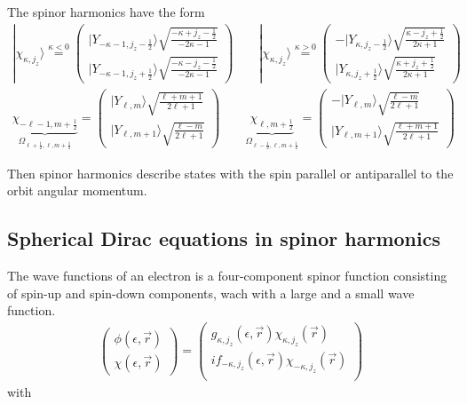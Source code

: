 \documentclass[11pt,a4paper]{report}
\begin{document}
The spinor harmonics have the form
\begin{eqnarray}
|\chi_{\kappa,j_z}\rangle
\stackrel{\kappa<0}{=}\left(
\begin{array}{c}
|Y_{-\kappa-1,j_z-\frac{1}{2}}\rangle
\sqrt{\frac{-\kappa+j_z-\frac{1}{2}}{-2\kappa-1}}\\
|Y_{-\kappa-1,j_z+\frac{1}{2}}\rangle
\sqrt{\frac{-\kappa-j_z-\frac{1}{2}}{-2\kappa-1}}\end{array}\right)
\qquad
|\chi_{\kappa,j_z}\rangle
\stackrel{\kappa>0}{=}\left(
\begin{array}{c}
-|Y_{\kappa,j_z-\frac{1}{2}}\rangle
\sqrt{\frac{\kappa-j_z+\frac{1}{2}}{2\kappa+1}}\\
|Y_{\kappa,j_z+\frac{1}{2}}\rangle
\sqrt{\frac{\kappa+j_z+\frac{1}{2}}{2\kappa+1}}\end{array}\right)
\label{eq:spinorharmonicskappa_a}
\\
\underbrace{\chi_{-\ell-1,m+\frac{1}{2}}}_{\Omega_{\ell+\frac{1}{2},\ell,m+\frac{1}{2}}}
=\left(
\begin{array}{c}
|Y_{\ell,m}\rangle\sqrt{\frac{\ell+m+1}{2\ell+1}}\\
|Y_{\ell,m+1}\rangle\sqrt{\frac{\ell-m}{2\ell+1}}\end{array}\right)
\qquad
\underbrace{\chi_{\ell,m+\frac{1}{2}}}_{\Omega_{\ell-\frac{1}{2},\ell,m+\frac{1}{2}}}
=\left(
\begin{array}{c}
-|Y_{\ell,m}\rangle\sqrt{\frac{\ell-m}{2\ell+1}}\\
|Y_{\ell,m+1}\rangle\sqrt{\frac{\ell+m+1}{2\ell+1}}\end{array}\right)
\label{eq:spinorharmonicskappa}
\end{eqnarray}

Then spinor harmonics describe states with the spin parallel or
antiparallel to the orbit angular momentum.

\subsection{Spherical Dirac equations in spinor harmonics}

The wave functions of an electron is a four-component spinor function
consisting of spin-up and spin-down components, wach with a large and
a small wave function.
\begin{eqnarray*}
\left(\begin{array}{c}\phi(\epsilon,\vec{r})\\\chi(\epsilon,\vec{r})
\end{array}\right) =
\left(\begin{array}{c}g_{\kappa,j_z}(\epsilon,\vec{r})
\chi_{\kappa,j_z}(\vec{r})\\ if_{-\kappa,j_z}(\epsilon,\vec{r})
\chi_{-\kappa,j_z}(\vec{r})\\ \end{array}\right) \end{eqnarray*} with
\end{document}

